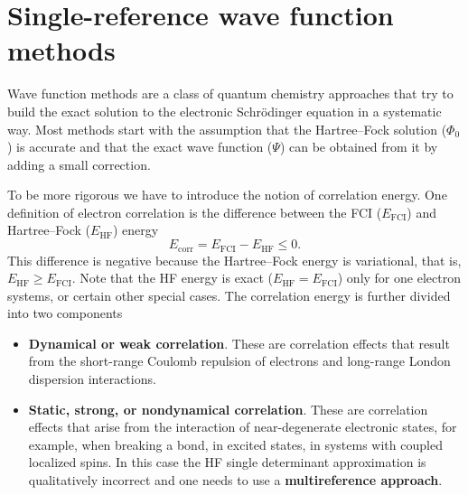 \documentclass[../Main/chem532-notes.tex]{subfiles}
\begin{document}
\chapter{Single-reference wave function methods}

Wave function methods are a class of quantum chemistry approaches that try to build the exact solution to the electronic Schr\"{o}dinger equation in a systematic way.
Most methods start with the assumption that the Hartree--Fock solution ($\Phi_0$) is accurate and that  the exact wave function ($\Psi$) can be obtained from it by adding a small correction.

To be more rigorous we have to introduce the notion of correlation energy. One definition of electron correlation is the difference between the FCI ($E_{\mathrm{FCI}}$)  and Hartree--Fock ($E_{\mathrm{HF}}$) energy
\begin{equation}
E_{\mathrm{corr}} = E_{\mathrm{FCI}} - E_{\mathrm{HF}} \leq 0.
\end{equation}
This difference is negative because the Hartree--Fock energy is variational, that is, $E_{\mathrm{HF}} \geq E_{\mathrm{FCI}}$. Note that the HF energy is exact ($E_{\mathrm{HF}} = E_{\mathrm{FCI}}$) only for one electron systems, or certain other special cases.
The correlation energy is further divided into two components
\begin{itemize}
\item \textbf{Dynamical or weak correlation}. These are correlation effects that result from the short-range Coulomb repulsion of electrons and long-range London dispersion interactions.
\item \textbf{Static, strong, or nondynamical correlation}. These are correlation effects that arise from the interaction of near-degenerate electronic states, for example, when breaking a bond, in excited states, in systems with coupled localized spins. In this case the HF single determinant approximation is qualitatively incorrect and one needs to use a \textbf{multireference approach}.
\end{itemize}
\end{document}
